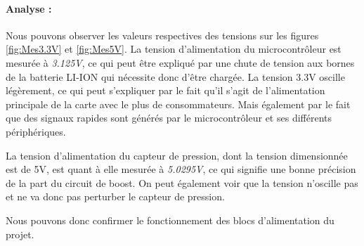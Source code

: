 {	\paragraph{Analyse :} Nous pouvons observer les valeurs respectives des tensions sur les figures \ref{fig:Mes3.3V} et \ref{fig:Mes5V}. La tension d'alimentation du microcontrôleur est mesurée à \textit{3.125V}, ce qui peut être expliqué par une chute de tension aux bornes de la batterie LI-ION qui nécessite donc d'être chargée. La tension 3.3V oscille légèrement, ce qui peut s'expliquer par le fait qu'il s'agit de l'alimentation principale de la carte avec le plus de consommateurs. Mais également par le fait que des signaux rapides sont générés par le microcontrôleur et ses différents périphériques.
	
	La tension d'alimentation du capteur de pression, dont la tension dimensionnée est de 5V, est quant à elle mesurée à \textit{5.0295V}, ce qui signifie une bonne précision de la part du circuit de boost. On peut également voir que la tension n'oscille pas et ne va donc pas perturber le capteur de pression.
	
	Nous pouvons donc confirmer le fonctionnement des blocs d'alimentation du projet.
}

